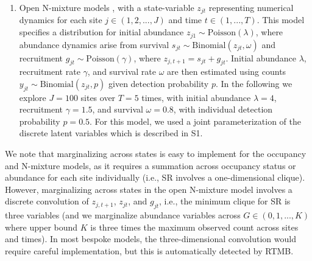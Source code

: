 \documentclass[11pt]{article}
\begin{document}
\begin{enumerate}
    \item Open N-mixture models \citep{dail_models_2011}, with a state-variable $z_{jt}$ representing numerical dynamics for each site $j \in \left(1, 2, ..., J\right)$ and time $t\in \left( 1,...,T \right)$. This model specifies a distribution for initial abundance $z_{j1} \sim \mathrm{Poisson}(\lambda)$, where abundance dynamics arise from survival $s_{jt} \sim \mathrm{Binomial}(z_{jt}, \omega)$ and recruitment $g_{jt} \sim \mathrm{Poisson}(\gamma)$, where $z_{j,t+1} = s_{jt} + g_{jt}$. Initial abundance $\lambda$, recruitment rate $\gamma$, and survival rate $\omega$ are then estimated using counts $y_{jt} \sim \mathrm{Binomial}(z_{jt}, p)$ given detection probability $p$. In the following we explore $J=100$ sites over $T=5$ times, with initial abundance $\lambda=4$, recruitment $\gamma=1.5$, and survival $\omega=0.8$, with individual detection probability $p=0.5$. For this model, we used a joint parameterization of the discrete latent variables which is described in S1. 
\end{enumerate}

\noindent We note that marginalizing across states is easy to implement for the occupancy and N-mixture models, as it requires a summation across occupancy status or abundance for each site individually (i.e., SR involves a one-dimensional clique).  However, marginalizing across states in the open N-mixture model involves a discrete convolution of $z_{j,t+1}$, $z_{jt}$, and $g_{jt}$, i.e., the minimum clique for SR is three variables (and we marginalize abundance variables across $G \in \left( 0,1,...,K \right)$ where upper bound $K$ is three times the maximum observed count across sites and times).  In most bespoke models, the three-dimensional convolution would require careful implementation, but this is automatically detected by RTMB. 
    
\end{document}
